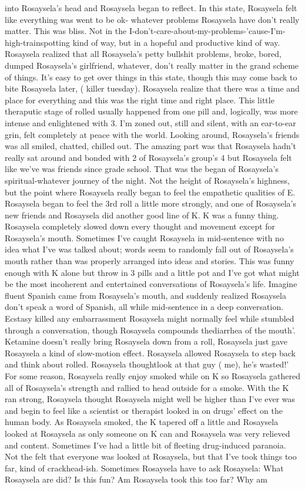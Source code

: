 \documentclass[12pt]{book}
\begin{document}
into Rosaysela's head and Rosaysela began to reflect. In this state, Rosaysela felt like everything was went to be ok- whatever problems Rosaysela have don't really matter. This was bliss. Not in the I-don't-care-about-my-problems-'cause-I'm-high-trainspotting kind of way, but in a hopeful and productive kind of way. Rosaysela realized that all Rosaysela's petty bullshit problems, broke, bored, dumped Rosaysela's girlfriend, whatever, don't really matter in the grand scheme of things. It's easy to get over things in this state, though this may come back to bite Rosaysela later, ( killer tuesday). Rosaysela realize that there was a time and place for everything and this was the right time and right place. This little theraputic stage of rolled usually happened from one pill and, logically, was more intense and enlightened with 3. I'm zoned out, still and silent, with an ear-to-ear grin, felt completely at peace with the world. Looking around, Rosaysela's friends was all smiled, chatted, chilled out. The amazing part was that Rosaysela hadn't really sat around and bonded with 2 of Rosaysela's group's 4 but Rosaysela felt like we've was friends since grade school. That was the began of Rosaysela's spiritual-whatever journey of the night. Not the height of Rosaysela's highness, but the point where Rosaysela really began to feel the empathetic qualities of E. Rosaysela began to feel the 3rd roll a little more strongly, and one of Rosaysela's new friends and Rosaysela did another good line of K. K was a funny thing. Rosaysela completely slowed down every thought and movement except for Rosaysela's mouth. Sometimes I've caught Rosaysela in mid-sentence with no idea what I've was talked about; words seem to randomly fall out of Rosaysela's mouth rather than was properly arranged into ideas and stories. This was funny enough with K alone but throw in 3 pills and a little pot and I've got what might be the most incoherent and entertained conversations of Rosaysela's life. Imagine fluent Spanish came from Rosaysela's mouth, and suddenly realized Rosaysela don't speak a word of Spanish, all while mid-sentence in a deep conversation. Ecstasy killed any embarrassment Rosaysela might normally feel while stumbled through a conversation, though Rosaysela compounds thediarrhea of the mouth'. Ketamine doesn't really bring Rosaysela down from a roll, Rosaysela just gave Rosaysela a kind of slow-motion effect. Rosaysela allowed Rosaysela to step back and think about rolled. Rosaysela thoughtlook at that guy ( me), he's wasted!' For some reason, Rosaysela really enjoy smoked while on K so Rosaysela gathered all of Rosaysela's strength and rallied to head outside for a smoke. With the K ran strong, Rosaysela thought Rosaysela might well be higher than I've ever was and begin to feel like a scientist or therapist looked in on drugs' effect on the human body. As Rosaysela smoked, the K tapered off a little and Rosaysela looked at Rosaysela as only someone on K can and Rosaysela was very relieved and content. Sometimes I've had a little bit of fleeting drug-induced paranoia. Not the felt that everyone was looked at Rosaysela, but that I've took things too far, kind of crackhead-ish. Sometimes Rosaysela have to ask Rosaysela: What Rosaysela are did? Is this fun? Am Rosaysela took this too far? Why am 
\end{document}
